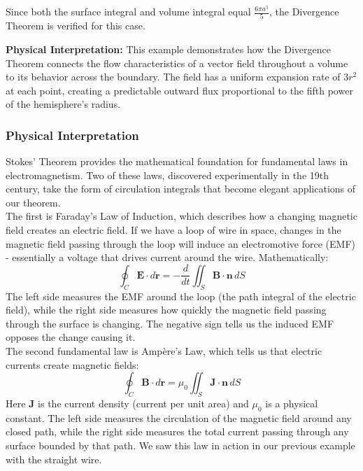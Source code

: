 \begin{example}
\begin{solution}
\noindent Since both the surface integral and volume integral equal $\frac{6\pi a^5}{5}$, the Divergence Theorem is verified for this case.

\noindent \textbf{Physical Interpretation:} This example demonstrates how the Divergence Theorem connects the flow characteristics of a vector field throughout a volume to its behavior across the boundary. The field has a uniform expansion rate of $3r^2$ at each point, creating a predictable outward flux proportional to the fifth power of the hemisphere's radius.
\end{solution}
\end{example}
\exampleline

\subsubsection*{Physical Interpretation}   

\noindent Stokes' Theorem provides the mathematical foundation for fundamental laws in electromagnetism. Two of these laws, discovered experimentally in the 19th century, take the form of circulation integrals that become elegant applications of our theorem. \\

\noindent The first is Faraday's Law of Induction, which describes how a changing magnetic field creates an electric field. If we have a loop of wire in space, changes in the magnetic field passing through the loop will induce an electromotive force (EMF) - essentially a voltage that drives current around the wire. Mathematically:
\[
\oint_C \mathbf{E} \cdot d\mathbf{r} = -\frac{d}{dt}\iint_S \mathbf{B} \cdot \mathbf{n}\,dS
\]
The left side measures the EMF around the loop (the path integral of the electric field), while the right side measures how quickly the magnetic field passing through the surface is changing. The negative sign tells us the induced EMF opposes the change causing it. \\

\noindent The second fundamental law is Ampère's Law, which tells us that electric currents create magnetic fields:
\[
\oint_C \mathbf{B} \cdot d\mathbf{r} = \mu_0\iint_S \mathbf{J} \cdot \mathbf{n}\,dS
\]
Here $\mathbf{J}$ is the current density (current per unit area) and $\mu_0$ is a physical constant. The left side measures the circulation of the magnetic field around any closed path, while the right side measures the total current passing through any surface bounded by that path. We saw this law in action in our previous example with the straight wire. \\

